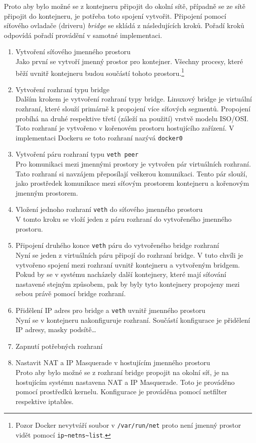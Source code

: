 Proto aby bylo možné se z kontejneru připojit do okolní sítě, případně se ze sítě připojit do kontejneru, je potřeba toto spojení vytvořit. Připojení pomocí síťového ovladače (driveru) \textit{bridge} se skládá z následujících kroků. Pořadí kroků odpovídá pořadí provádění v samotné implementaci.
\begin{enumerate}
\item Vytvoření síťového jmenného prostoru\\
Jako první se vytvoří jmenný prostor pro kontejner. Všechny procesy, které běží uvnitř kontejneru budou součástí tohoto prostoru.\footnote{Pozor Docker nevytváří soubor v \verb-/var/run/net- proto není jmenný prostor vidět pomocí \verb-ip~netns~list-.}
\item Vytvoření rozhraní typu bridge\\
Dalším krokem je vytvoření rozhraní typy bridge. Linuxový bridge je virtuální rozhraní, které slouží primárně k propojení více síťových segmentů. Propojení probíhá na druhé respektive třetí (záleží na použití) vrstvě modelu ISO/OSI. Toto rozhraní je vytvořeno v kořenovém prostoru hostujícího zařízení. V implementaci Dockeru se toto rozhraní nazývá \verb|docker0|
\item Vytvoření páru rozhraní typu \verb|veth peer|\\
Pro komunikaci mezi jmennými prostory je vytvořen pár virtuálních rozhraní. Tato rozhraní si navzájem přeposílají veškerou komunikaci. Tento pár slouží, jako prostředek komunikace mezi síťovým prostorem kontejneru a kořenovým jmenným prostorem.
\item Vložení jednoho rozhraní \verb|veth| do síťového jmenného prostoru\\
V tomto kroku se vloží jeden z páru rozhraní do vytvořeného jmenného prostoru. 
\item Připojení druhého konce \verb|veth| páru do vytvořeného bridge rozhraní\\
Nyní se jeden z virtuálních páru připojí do rozhraní bridge. V tuto chvíli je vytvořeno spojení mezi rozhraní uvnitř kontejneru a vytvořeným bridgem. Pokud by se v systému nacházely další kontejnery, které mají síťování nastavené stejným způsobem, pak by byly tyto kontejnery propojeny mezi sebou právě pomocí bridge rozhraní.
\item Přidělení IP adres pro bridge a \verb|veth| uvnitř jmenného prostoru\\
Nyní se v kontejneru nakonfiguruje rozhraní. Součástí konfigurace je přidělení IP adresy, masky podsítě\ldots  
\item Zapnutí potřebných rozhraní\\
\item Nastavit NAT a IP Masquerade v hostujícím jmenného prostoru\\
Proto aby bylo možné se z rozhraní bridge propojit na okolní síť, je na hostujícím systému nastavena NAT a IP Masquerade. Toto je prováděno pomocí prostředků kernelu. Konfigurace je prováděna pomocí netfilter respektive iptables.
\end{enumerate}

